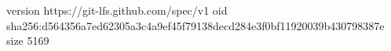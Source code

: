 version https://git-lfs.github.com/spec/v1
oid sha256:d564356a7ed62305a3c4a9ef45f79138decd284e3f0bf11920039b430798387e
size 5169
